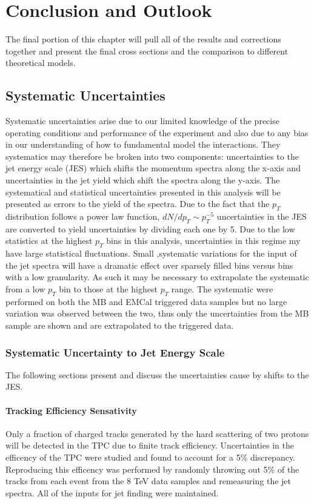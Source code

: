 \chapter{Conclusion and Outlook} \label{ch:cando}

The final portion of this chapter will pull all of the results and corrections together and present the final cross sections and the comparison to different theoretical models.  

\section{Systematic Uncertainties}

Systematic uncertainties arise due to our limited knowledge of the precise operating conditions and performance of the experiment and also due to any bias in our understanding of how to fundamental model the interactions.  They systematics may therefore be broken into two components: uncertainties to the jet energy scale (JES) which shifts the momentum spectra along the x-axis and uncertainties in the jet yield which shift the spectra along the y-axis.  The systematical and statistical uncertainties presented in this analysis will be presented as errors to the yield of the spectra.  Due to the fact that the $p_{T}$ distribution follows a power law function, $dN/dp_{T} \sim p_{T}^{-5}$ uncertainties in the JES are converted to yield uncertainties by dividing each one by 5.
Due to the low statistics at the highest $p_{T}$ bins in this analysis, uncertainties in this regime my have large statistical fluctuations.  Small ,systematic variations for the input of the jet spectra will have a dramatic effect over sparsely filled bins versus bins with a low granularity.  As such it may be necessary to extrapolate the systematic from a low $p_{T}$ bin to those at the highest $p_{T}$ range.  The systematic were performed on both the MB and EMCal triggered data samples but no large variation was observed between the two, thus only the uncertainties from the MB sample are shown and are extrapolated to the triggered data.


\subsection{Systematic Uncertainty to Jet Energy Scale}

The following sections present and discuss the uncertainties cause by shifts to the JES.

\subsubsection{Tracking Efficiency Sensativity}
Only a fraction of charged tracks generated by the hard scattering of two protons will be detected in the TPC due to finite track efficiency.  Uncertainties in the efficency of the TPC were studied and found to account for a 5\% discrepancy\cite{Abelev:2013ala}.  Reproducing this efficency was performed by randomly throwing out 5\% of the tracks from each event from the 8 TeV data samples and remeasuring the jet spectra.  All of the inputs for jet finding were maintained.


